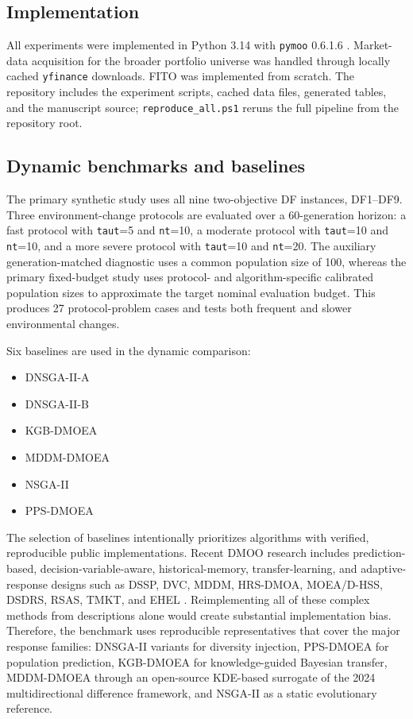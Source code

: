 \documentclass[preprint,12pt]{elsarticle}
\begin{document}
\subsection{Implementation}

All experiments were implemented in Python 3.14 with \texttt{pymoo} 0.6.1.6 \cite{Blank2020Pymoo}. Market-data acquisition for the broader portfolio universe was handled through locally cached \texttt{yfinance} downloads. FITO was implemented from scratch. The repository includes the experiment scripts, cached data files, generated tables, and the manuscript source; \texttt{reproduce\_all.ps1} reruns the full pipeline from the repository root.

\subsection{Dynamic benchmarks and baselines}

The primary synthetic study uses all nine two-objective DF instances, DF1--DF9. Three environment-change protocols are evaluated over a 60-generation horizon: a fast protocol with \texttt{taut}=5 and \texttt{nt}=10, a moderate protocol with \texttt{taut}=10 and \texttt{nt}=10, and a more severe protocol with \texttt{taut}=10 and \texttt{nt}=20. The auxiliary generation-matched diagnostic uses a common population size of 100, whereas the primary fixed-budget study uses protocol- and algorithm-specific calibrated population sizes to approximate the target nominal evaluation budget. This produces 27 protocol-problem cases and tests both frequent and slower environmental changes.

Six baselines are used in the dynamic comparison:
\begin{itemize}
    \item DNSGA-II-A \cite{Deb2007DNSGAII}
    \item DNSGA-II-B \cite{Deb2007DNSGAII}
    \item KGB-DMOEA \cite{Ye2022KGB}
    \item MDDM-DMOEA \cite{Gao2024MDDM}
    \item NSGA-II \cite{Deb2002NSGAII}
    \item PPS-DMOEA \cite{Zhou2014Population}
\end{itemize}

The selection of baselines intentionally prioritizes algorithms with verified, reproducible public implementations. Recent DMOO research includes prediction-based, decision-variable-aware, historical-memory, transfer-learning, and adaptive-response designs such as DSSP, DVC, MDDM, HRS-DMOA, MOEA/D-HSS, DSDRS, RSAS, TMKT, and EHEL \cite{Wu2023DSSP,Wu2023DVC,Gao2024MDDM,Li2024HRS,Hu2024HSS,Ma2024DSDRS,Li2024RSAS,Zhao2025TMKT,Guan2026EHEL}. Reimplementing all of these complex methods from descriptions alone would create substantial implementation bias. Therefore, the benchmark uses reproducible representatives that cover the major response families: DNSGA-II variants for diversity injection, PPS-DMOEA for population prediction, KGB-DMOEA for knowledge-guided Bayesian transfer, MDDM-DMOEA through an open-source KDE-based surrogate of the 2024 multidirectional difference framework, and NSGA-II as a static evolutionary reference.
\end{document}
